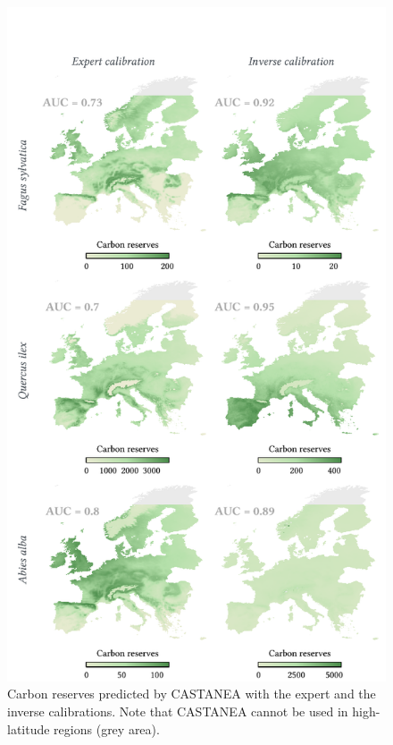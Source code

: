 \documentclass[11pt,]{article}
\begin{document}
\begin{figure}[H]

{\centering \includegraphics{figs/best_forward_maps} 

}

\caption{Carbon reserves predicted by CASTANEA with the expert and the inverse calibrations. Note that CASTANEA cannot be used in high-latitude regions (grey area).}\label{fig:best_forward_maps}
\end{figure}
\end{document}
